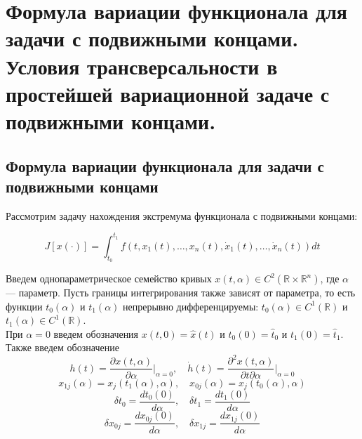 \section{Формула вариации функционала для задачи с подвижными концами. Условия трансверсальности в простейшей вариационной задаче с подвижными концами.}

\subsection{Формула вариации функционала для задачи с подвижными концами}

Рассмотрим задачу нахождения экстремума функционала с подвижными концами:

$$J[x(\cdot)] = \int_{t_0}^{t_1} f\left(t, x_1(t), \dots, x_n(t), \dot{x}_1(t), \dots, \dot{x}_n(t)\right) dt$$

Введем однопараметрическое семейство кривых 
$x(t, \alpha) \in C^2(\mathbb{R} \times \mathbb{R}^n)$,
где $\alpha$ --- параметр. Пусть границы интегрирования также зависят
от параметра, то есть функции $t_0(\alpha)$ и $t_1(\alpha)$ непрерывно 
дифференцируемы: $t_0(\alpha) \in C^1(\mathbb{R})$ и $t_1(\alpha) \in C^1(\mathbb{R})$.\\
При $\alpha = 0$ введем обозначения $x(t, 0) = \hat{x}(t)$ и
$t_0(0) = \hat{t}_0$ и $t_1(0) = \hat{t}_1$.\\
Также введем обозначение 
$$h(t) = \frac{\partial x(t, \alpha)}{\partial \alpha}\big|_{\alpha=0},
\quad \dot{h}(t) = \frac{\partial^2 x(t, \alpha)}{\partial t \partial \alpha}\big|_{\alpha=0}$$
$$x_{1j}(\alpha) = x_j(t_1(\alpha), \alpha), \quad x_{0j}(\alpha) = x_j(t_0(\alpha), \alpha)$$
$$\delta t_0 = \frac{d t_0(0)}{d\alpha}, \quad \delta t_1 = \frac{d t_1(0)}{d\alpha}$$
$$\delta x_{0j} = \frac{d x_{0j}(0)}{d \alpha}, \quad  \delta x_{1j} = \frac{d x_{1j}(0)}{d \alpha}$$

